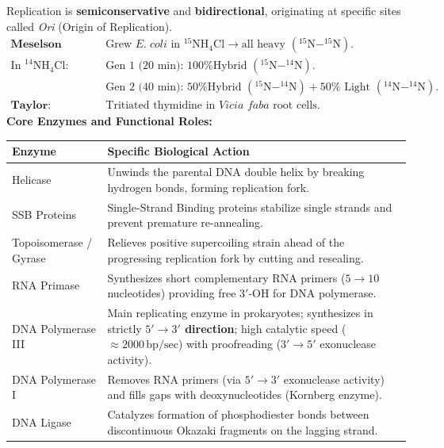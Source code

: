 \documentclass[10pt,a4paper]{article}
\begin{document}
\begin{formulabox}
Replication is \textbf{semiconservative} and \textbf{bidirectional}, originating at specific sites called \textit{Ori} (Origin of Replication).
\begin{align*}
  \textbf{Meselson \& Stahl: } & \text{Grew } E.\; coli \text{ in }^{15}\mathrm{NH_4Cl} \to \text{all heavy } (^{15}\mathrm{N}-^{15}\mathrm{N}).\\
  \text{In }^{14}\mathrm{NH_4Cl}: \quad & \text{Gen 1 (20 min): 100\% Hybrid } (^{15}\mathrm{N}-^{14}\mathrm{N}).\\
  & \text{Gen 2 (40 min): 50\% Hybrid } (^{15}\mathrm{N}-^{14}\mathrm{N}) + 50\% \text{ Light } (^{14}\mathrm{N}-^{14}\mathrm{N}).\\
  \textbf{Taylor: } & \text{Tritiated thymidine in } \textit{Vicia faba} \text{ root cells.}
\end{align*}
\textbf{Core Enzymes and Functional Roles:}
\begin{center}
\small
\begin{tabular}{|l|p{11.5cm}|}
\hline
\textbf{Enzyme} & \textbf{Specific Biological Action} \\
\hline
Helicase & Unwinds the parental DNA double helix by breaking hydrogen bonds, forming replication fork. \\
SSB Proteins & Single-Strand Binding proteins stabilize single strands and prevent premature re-annealing. \\
Topoisomerase / Gyrase & Relieves positive supercoiling strain ahead of the progressing replication fork by cutting and resealing. \\
RNA Primase & Synthesizes short complementary RNA primers ($5\to 10$ nucleotides) providing free $3'\text{-OH}$ for DNA polymerase. \\
DNA Polymerase III & Main replicating enzyme in prokaryotes; synthesizes in strictly \textbf{$5'\to 3'$ direction}; high catalytic speed ($\approx 2000\,\mathrm{bp/sec}$) with proofreading ($3'\to 5'$ exonuclease activity). \\
DNA Polymerase I & Removes RNA primers (via $5'\to 3'$ exonuclease activity) and fills gaps with deoxynucleotides (Kornberg enzyme). \\
DNA Ligase & Catalyzes formation of phosphodiester bonds between discontinuous Okazaki fragments on the lagging strand. \\
\hline
\end{tabular}
\end{center}
\end{formulabox}
\end{document}

